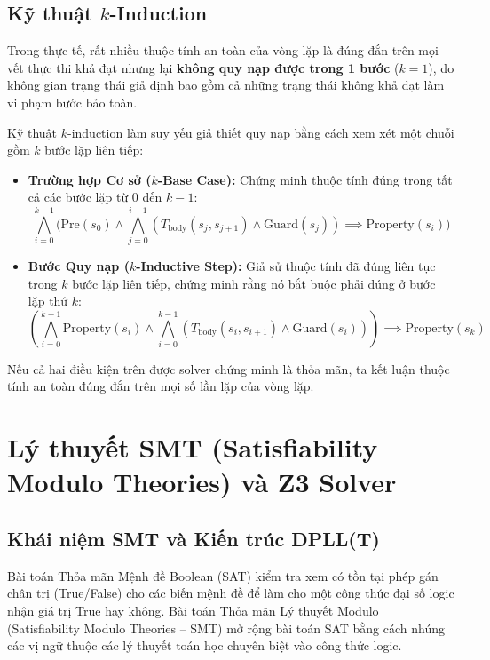 \subsection{Kỹ thuật $k$-Induction}
Trong thực tế, rất nhiều thuộc tính an toàn của vòng lặp là đúng đắn trên mọi vết thực thi khả đạt nhưng lại \textbf{không quy nạp được trong 1 bước} ($k=1$), do không gian trạng thái giả định bao gồm cả những trạng thái không khả đạt làm vi phạm bước bảo toàn.

Kỹ thuật $k$-induction làm suy yếu giả thiết quy nạp bằng cách xem xét một chuỗi gồm $k$ bước lặp liên tiếp:
\begin{itemize}
    \item \textbf{Trường hợp Cơ sở ($k$-Base Case):} Chứng minh thuộc tính đúng trong tất cả các bước lặp từ $0$ đến $k-1$:
    \begin{equation}
    \bigwedge_{i=0}^{k-1} \Big( \text{Pre}(s_0) \land \bigwedge_{j=0}^{i-1} (T_{\text{body}}(s_j, s_{j+1}) \land \text{Guard}(s_j)) \implies \text{Property}(s_i) \Big)
    \end{equation}
    \item \textbf{Bước Quy nạp ($k$-Inductive Step):} Giả sử thuộc tính đã đúng liên tục trong $k$ bước lặp liên tiếp, chứng minh rằng nó bắt buộc phải đúng ở bước lặp thứ $k$:
    \begin{equation}
    \left( \bigwedge_{i=0}^{k-1} \text{Property}(s_i) \land \bigwedge_{i=0}^{k-1} (T_{\text{body}}(s_i, s_{i+1}) \land \text{Guard}(s_i)) \right) \implies \text{Property}(s_k)
    \end{equation}
\end{itemize}

Nếu cả hai điều kiện trên được solver chứng minh là thỏa mãn, ta kết luận thuộc tính an toàn đúng đắn trên mọi số lần lặp của vòng lặp.

\section{Lý thuyết SMT (Satisfiability Modulo Theories) và Z3 Solver}
\label{sec:smt_and_z3}

\subsection{Khái niệm SMT và Kiến trúc DPLL(T)}
Bài toán Thỏa mãn Mệnh đề Boolean (SAT) kiểm tra xem có tồn tại phép gán chân trị (True/False) cho các biến mệnh đề để làm cho một công thức đại số logic nhận giá trị True hay không. Bài toán Thỏa mãn Lý thuyết Modulo (Satisfiability Modulo Theories -- SMT) mở rộng bài toán SAT bằng cách nhúng các vị ngữ thuộc các lý thuyết toán học chuyên biệt vào công thức logic.

